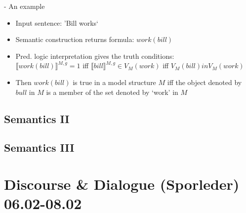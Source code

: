 \documentclass[11pt]{article}
\begin{document}
- An example
\begin{itemize}
 \item Input sentence: 'Bill works`
 \item Semantic construction returns formula: $work(bill)$
 \item Pred. logic interpretation gives the truth conditions: \\$\llbracket work(bill)\rrbracket^{M,g} = 1$ iff $\llbracket bill\rrbracket^{M,g} \in V_M (work)$ iff $V_M (bill) in V_M(work)$
 \item Then $work(bill)$ is true in a model structure $M$ iff the object denoted by $bull$ in $M$ is a member of the set denoted by `work' in $M$
\end{itemize}

\subsection{ Semantics II }
\subsection{ Semantics III }

\section{Discourse \& Dialogue (Sporleder) 06.02-08.02}
\end{document}
